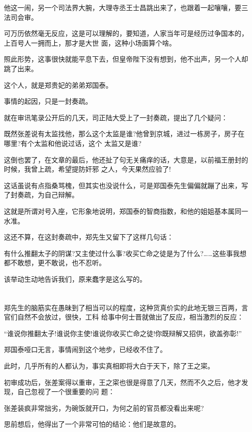 \documentclass[11pt,a4paper,onecolumn]{article}
\begin{document}
他这一闹，另一个司法界大腕，大理寺丞王士昌跳出来了，也跟着一起嚷嚷，要三法司会审。

可万历依然毫无反应，这是可以理解的，要知道，人家当年可是经历过争国本的，上百号人一拥而上，那才是大世
面，这种小场面算个啥。

照此形势，这事很快就能平息下去，但皇帝陛下没有想到，他不出声，另一个人却跳了出来。

这个人，就是郑贵妃的弟弟郑国泰。

事情的起因，只是一封奏疏。

就在审讯笔录公开后的几天，司正陆大受上了一封奏疏，提出了几个疑问：

既然张差说有太监找他，那么这个太监是谁?他曾到京城，进过一栋房子，房子在哪里?有个太监和他说过话，这个
太监又是谁?

这倒也罢了，在文章的最后，他还扯了句无关痛痒的话，大意是，以前福王册封的时候，我曾上疏，希望提防奸邪
之人，今天果然应验了!

这话虽说有点指桑骂槐，但其实也没说什么，可是郑国泰先生偏偏就蹦了出来，写了封奏疏，为自己辩解。

这就是所谓对号入座，它形象地说明，郑国泰的智商指数，和他的姐姐基本属同一水准。

这还不算，在这封奏疏中，郑先生又留下了这样几句话：

有什么推翻太子的阴谋?又主使过什么事?收买亡命之徒是为了什么?……这些事我想都不敢想，更不敢说，也不忍听。

该举动生动地告诉我们，原来蠢字是这么写的。

\section[\thesection]{}

郑先生的脑筋实在愚昧到了相当可以的程度，这种货真价实的此地无银三百两，言官们自然不会放过，很快，工科
给事中何士晋就做出了反应，相当激烈的反应：

``谁说你推翻太子!谁说你主使!谁说你收买亡命之徒!你既辩解又招供，欲盖弥彰!''

郑国泰哑口无言，事情闹到这个地步，已经收不住了。

此时，几乎所有的人都认为，事实真相即将大白于天下，除了王之寀。

初审成功后，张差案得以重审，王之寀也很是得意了几天，然而不久之后，他才发现，自己忽视了一个很重要的问
题：

张差装疯非常拙劣，为碗饭就开口，为何之前的官员都没看出来呢?

思前想后，他得出了一个非常可怕的结论：他们是故意的。
\end{document}
